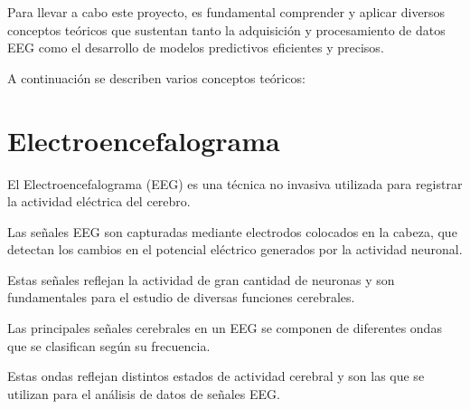 
Para llevar a cabo este proyecto, es fundamental comprender y aplicar diversos conceptos teóricos que sustentan tanto la adquisición y procesamiento de datos EEG como el desarrollo de modelos predictivos eficientes y precisos. 

A continuación se describen varios conceptos teóricos:


\section{Electroencefalograma}

El Electroencefalograma (EEG) es una técnica no invasiva utilizada para registrar la actividad eléctrica del cerebro.

Las señales EEG son capturadas mediante electrodos colocados en la cabeza, que detectan los cambios en el potencial eléctrico generados por la actividad neuronal. 

Estas señales reflejan la actividad de gran cantidad de neuronas y son fundamentales para el estudio de diversas funciones cerebrales.



Las principales señales cerebrales en un EEG se componen de diferentes ondas que se clasifican según su frecuencia. 

Estas ondas reflejan distintos estados de actividad cerebral y son las que se utilizan para el análisis de datos de señales EEG.


